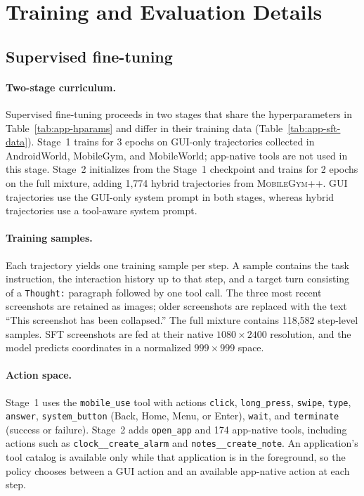 \section{Training and Evaluation Details}
\label{app:details}

\subsection{Supervised fine-tuning}
\label{app:sft}

\paragraph{Two-stage curriculum.}
Supervised fine-tuning proceeds in two stages that share the hyperparameters in Table~\ref{tab:app-hparams} and differ in their training data (Table~\ref{tab:app-sft-data}). Stage~1 trains for 3 epochs on GUI-only trajectories collected in AndroidWorld, MobileGym, and MobileWorld; app-native tools are not used in this stage. Stage~2 initializes from the Stage~1 checkpoint and trains for 2 epochs on the full mixture, adding 1,774 hybrid trajectories from \textsc{MobileGym++}. GUI trajectories use the GUI-only system prompt in both stages, whereas hybrid trajectories use a tool-aware system prompt.

\paragraph{Training samples.}
Each trajectory yields one training sample per step. A sample contains the task instruction, the interaction history up to that step, and a target turn consisting of a \texttt{Thought:} paragraph followed by one tool call. The three most recent screenshots are retained as images; older screenshots are replaced with the text ``This screenshot has been collapsed.'' The full mixture contains 118,582 step-level samples. SFT screenshots are fed at their native $1080\times2400$ resolution, and the model predicts coordinates in a normalized $999\times999$ space.

\paragraph{Action space.}
Stage~1 uses the \texttt{mobile\_use} tool with actions \texttt{click}, \texttt{long\_press}, \texttt{swipe}, \texttt{type}, \texttt{answer}, \texttt{system\_button} (Back, Home, Menu, or Enter), \texttt{wait}, and \texttt{terminate} (success or failure). Stage~2 adds \texttt{open\_app} and 174 app-native tools, including actions such as \texttt{clock\_\_create\_alarm} and \texttt{notes\_\_create\_note}. An application's tool catalog is available only while that application is in the foreground, so the policy chooses between a GUI action and an available app-native action at each step.

